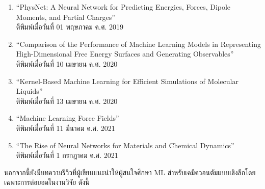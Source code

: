 \begin{enumerate}
    \item \enquote{PhysNet: A Neural Network for Predicting Energies, Forces, Dipole Moments, and 
    Partial Charges}\autocite{unke2019}\\
    ตีพิมพ์เมื่อวันที่ 01 พฤษภาคม ค.ศ. 2019
    
    \item \enquote{Comparison of the Performance of Machine Learning Models in Representing High-Dimensional 
    Free Energy Surfaces and Generating Observables}\autocite{cendagorta2020}\\
    ตีพิมพ์เมื่อวันที่ 10 เมษายน ค.ศ. 2020
    
    \item \enquote{Kernel-Based Machine Learning for Efficient Simulations of Molecular Liquids}\autocite{scherer2020}\\
    ตีพิมพ์เมื่อวันที่ 13 เมษายน ค.ศ. 2020

    \item \enquote{Machine Learning Force Fields}\autocite{unke2021}\\
    ตีพิมพ์เมื่อวันที่ 11 มีนาคม ค.ศ. 2021

    \item \enquote{The Rise of Neural Networks for Materials and Chemical Dynamics}\autocite{kulichenko2021}\\
    ตีพิมพ์เมื่อวันที่ 1 กรกฎาคม ค.ศ. 2021

\end{enumerate}

นอกจากนี้ยังมีบทความรีวิวที่ผู้เขียนแนะนำให้ผู้สนใจศึกษา ML สำหรับเคมีควอนตัมแบบเชิงลึกโดยเฉพาะการต่อยอดในงานวิจัย ดังนี้

